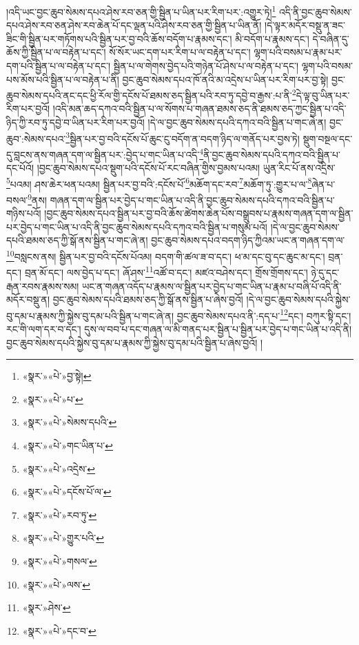 །འདི་ཡང་བྱང་ཆུབ་སེམས་དཔའ་ཤེས་རབ་ཅན་གྱི་སྦྱིན་པ་ཡིན་པར་རིག་པར་:འགྱུར་ཏེ།\footnote{«སྣར་»«པེ་»བྱ་སྟེ།} འདི་ནི་བྱང་ཆུབ་སེམས་དཔའ་ཤེས་རབ་ཅན་ཤེས་རབ་ཆེན་པོ་དང་ལྡན་པའི་ཤེས་རབ་ཅན་གྱི་སྦྱིན་པ་ཡིན་ནོ། །དེ་ལྟར་མདོར་བསྡུ་ན་ཟང་ཟིང་གི་སྦྱིན་པར་གཏོགས་པའི་སྦྱིན་པར་བྱ་བའི་ཆོས་བདོག་པ་རྣམས་དང་། མི་བདོག་པ་རྣམས་དང་། དེ་བཞིན་དུ་ཆོས་ཀྱི་སྦྱིན་པ་ལ་བརྟེན་པ་དང་། སོ་སོར་ཡང་དག་པར་རིག་པ་ལ་བརྟེན་པ་དང་། ལྷག་པའི་བསམ་པ་རྣམ་པར་དག་པའི་སྦྱིན་པ་ལ་བརྟེན་པ་དང་། སྦྱིན་པ་ལ་གེགས་བྱེད་པའི་གཉེན་པོ་ཤེས་པ་ལ་བརྟེན་པ་དང་། ལྷག་པའི་བསམ་པས་མོས་པའི་སྦྱིན་པ་ལ་བརྟེན་པ་ནི། བྱང་ཆུབ་སེམས་དཔའ་ཁོ་ནའི་མ་འདྲེས་པ་ཡིན་པར་རིག་པར་བྱ་སྟེ། བྱང་ཆུབ་སེམས་དཔའི་ནང་དང་ཕྱི་རོལ་གྱི་དངོས་པོ་ཐམས་ཅད་སྦྱིན་པའི་རབ་ཏུ་དབྱེ་བ་རྒྱས་:པ་ནི་\footnote{«སྣར་»«པེ་»པ་}དེ་ལྟ་བུ་ཡིན་པར་རིག་པར་བྱའོ། །འདི་མན་ཆད་དཀའ་བའི་སྦྱིན་པ་ལ་སོགས་པ་གཞན་ཐམས་ཅད་ནི་ཐམས་ཅད་ཀྱང་སྦྱིན་པ་འདི་ཉིད་ཀྱི་རབ་ཏུ་དབྱེ་བ་ཡིན་པར་རིག་པར་བྱའོ། །དེ་ལ་བྱང་ཆུབ་སེམས་དཔའི་དཀའ་བའི་སྦྱིན་པ་གང་ཞེ་ན། བྱང་ཆུབ་:སེམས་དཔའ་\footnote{«སྣར་»«པེ་»སེམས་དཔའི་}སྦྱིན་པར་བྱ་བའི་དངོས་པོ་ཆུང་ངུ་བདོག་ན་བདག་ཉིད་ལ་གནོད་པར་བྱས་ཏེ། སྡུག་བསྔལ་དང་དུ་བླངས་ནས་གཞན་དག་ལ་སྦྱིན་པར་:བྱེད་པ་གང་ཡིན་པ་འདི་\footnote{«སྣར་»«པེ་»གང་ཡིན་པ་}ནི་བྱང་ཆུབ་སེམས་དཔའི་དཀའ་བའི་སྦྱིན་པ་དང་པོའོ། །བྱང་ཆུབ་སེམས་དཔའ་སྡུག་པའི་དངོས་པོ་རང་བཞིན་གྱིས་བྱམས་པའམ། ཡུན་རིང་པོ་ནས་འདྲིས་\footnote{«སྣར་»«པེ་»འདྲེས་}པའམ། ཤས་ཆེར་ཕན་པའམ། སྦྱིན་པར་བྱ་བའི་:དངོས་པོ་\footnote{«སྣར་»«པེ་»དངོས་པོ་ལ་}མཆོག་དང་རབ་\footnote{«སྣར་»«པེ་»རབ་ཏུ་}མཆོག་ཏུ་:གྱུར་པ་ལ་\footnote{«སྣར་»«པེ་»གྱུར་པའི་}ཞེན་པ་བསལ་\footnote{«སྣར་»«པེ་»གསལ་}ནས། གཞན་དག་ལ་སྦྱིན་པར་བྱེད་པ་གང་ཡིན་པ་འདི་ནི་བྱང་ཆུབ་སེམས་དཔའི་དཀའ་བའི་སྦྱིན་པ་གཉིས་པའོ། །བྱང་ཆུབ་སེམས་དཔའ་སྦྱིན་པར་བྱ་བའི་ཆོས་ཚེགས་ཆེན་པོས་བསྒྲུབས་པ་རྣམས་གཞན་དག་ལ་སྦྱིན་པར་བྱེད་པ་གང་ཡིན་པ་འདི་ནི་བྱང་ཆུབ་སེམས་དཔའི་དཀའ་བའི་སྦྱིན་པ་གསུམ་པའོ། །དེ་ལ་བྱང་ཆུབ་སེམས་དཔའི་ཐམས་ཅད་ཀྱི་སྒོ་ནས་སྦྱིན་པ་གང་ཞེ་ན། བྱང་ཆུབ་སེམས་དཔའ་བདག་ཉིད་ཀྱིའམ་ཡང་ན་གཞན་དག་ལ་\footnote{«སྣར་»«པེ་»ལས་}བསླངས་ནས། སྦྱིན་པར་བྱ་བའི་དངོས་པོའམ། བདག་གི་ཚལ་ཟ་བ་དང་། ཕ་མ་དང་བུ་དང་ཆུང་མ་དང་། བྲན་དང་། བྲན་མོ་དང་། ལས་བྱེད་པ་དང་། ཞོ་ཤས་\footnote{«སྣར་»ཤེས་}འཚོ་བ་དང་། མཛའ་བཤེས་དང་། གྲོས་གྲོགས་དང་། ཉེ་དུ་དང་རྒན་རབས་རྣམས་སམ། ཡང་ན་གཞན་འདོད་པ་རྣམས་ལ་སྦྱིན་པར་བྱེད་པ་གང་ཡིན་པ་རྣམ་པ་བཞི་པོ་འདི་ནི་མདོར་བསྡུ་ན། བྱང་ཆུབ་སེམས་དཔའི་ཐམས་ཅད་ཀྱི་སྒོ་ནས་སྦྱིན་པ་ཞེས་བྱའོ། །དེ་ལ་བྱང་ཆུབ་སེམས་དཔའི་སྐྱེས་བུ་དམ་པ་རྣམས་ཀྱི་སྐྱེས་བུ་དམ་པའི་སྦྱིན་པ་གང་ཞེ་ན། བྱང་ཆུབ་སེམས་དཔའ་ནི་:དད་པ་\footnote{«སྣར་»«པེ་»དང་བ་}དང་། བཀུར་སྟི་དང་། རང་གི་ལག་དར་བ་དང་། དུས་ལ་བབ་པ་དང་གཞན་ལ་མི་གནད་པར་སྦྱིན་པ་སྦྱིན་པར་བྱེད་པ་གང་ཡིན་པ་འདི་ནི། བྱང་ཆུབ་སེམས་དཔའི་སྐྱེས་བུ་དམ་པ་རྣམས་ཀྱི་སྐྱེས་བུ་དམ་པའི་སྦྱིན་པ་ཞེས་བྱའོ། །
